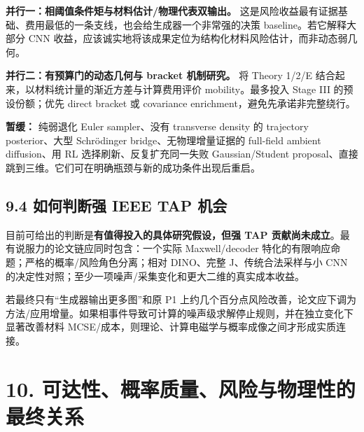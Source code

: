 \documentclass[
  11pt,
  a4paper,
]{article}
\begin{document}
\textbf{并行一：相阈值条件矩与材料估计/物理代表双输出。}
这是风险收益最有证据基础、费用最低的一条支线，也会给生成器一个非常强的决策
baseline。若它解释大部分 CNN
收益，应该诚实地将该成果定位为结构化材料风险估计，而非动态弱几何。

\textbf{并行二：有预算门的动态几何与 bracket 机制研究。} 将 Theory 1/2/E
结合起来，以材料统计量的渐近方差与计算费用评价 mobility。最多投入 Stage
III 的预设份额；优先 direct bracket 或 covariance
enrichment，避免先承诺非完整绕行。

\textbf{暂缓：} 纯弱退化 Euler sampler、没有 transverse density 的
trajectory posterior、大型 Schrödinger bridge、无物理增量证据的
full-field ambient diffusion、用 RL 选择刷新、反复扩充同一失败
Gaussian/Student
proposal、直接跳到三维。它们可在明确瓶颈与新的成功条件出现后重启。

\hypertarget{ux5982ux4f55ux5224ux65adux5f3a-ieee-tap-ux673aux4f1a}{%
\subsection{9.4 如何判断强 IEEE TAP
机会}\label{ux5982ux4f55ux5224ux65adux5f3a-ieee-tap-ux673aux4f1a}}

目前可给出的判断是\textbf{有值得投入的具体研究假设，但强 TAP
贡献尚未成立}。最有说服力的论文链应同时包含：一个实际 Maxwell/decoder
特化的有限响应命题；严格的概率/风险角色分离；相对 DINO、完整
J、传统合法采样与小 CNN
的决定性对照；至少一项噪声/采集变化和更大二维的真实成本收益。

若最终只有``生成器输出更多图''和原 P1
上约几个百分点风险改善，论文应下调为方法/应用增量。如果相事件导致可计算的噪声级求解停止规则，并在独立变化下显著改善材料
MCSE/成本，则理论、计算电磁学与概率成像之间才形成实质连接。

\hypertarget{ux53efux8fbeux6027ux6982ux7387ux8d28ux91cfux98ceux9669ux4e0eux7269ux7406ux6027ux7684ux6700ux7ec8ux5173ux7cfb}{%
\section{10.
可达性、概率质量、风险与物理性的最终关系}\label{ux53efux8fbeux6027ux6982ux7387ux8d28ux91cfux98ceux9669ux4e0eux7269ux7406ux6027ux7684ux6700ux7ec8ux5173ux7cfb}}
\end{document}
